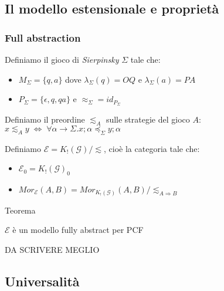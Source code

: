 \documentclass{beamer}
\begin{document}
\subsection{Il modello estensionale e proprietà}

\begin{frame}
	
	\frametitle{Full abstraction}
	
	Definiamo il gioco di \emph{Sierpinsky} $\Sigma$ tale che:
	\begin{itemize}
		\item $M_\Sigma = \{ q,a \}$ dove $\lambda_\Sigma (q)=OQ$ e $\lambda_\Sigma (a)=PA$
		\item $P_\Sigma = \{ \epsilon , q , qa \}$ e $\approx_\Sigma = id_{P_\Sigma}$
	\end{itemize}
	
	Definiamo il preordine $\lesssim_A$ sulle strategie del gioco $A$: $x \lesssim_A y \; \Leftrightarrow \; \forall \alpha \rightarrow \Sigma . x;\alpha \preccurlyeq_\Sigma y;\alpha$
	
	Definiamo $\mathcal{E} = K_!(\mathcal{G}) / \lesssim$, cioè la categoria tale che:
	\begin{itemize}
		\item $\mathcal{E}_0 = K_!(\mathcal{G})_0$
		\item $Mor_{\mathcal{E}}(A,B) = Mor_{K_!(\mathcal{G})}(A,B) / \lesssim_{A\Rightarrow B}$
	\end{itemize}

	
	\begin{block}{Teorema}
		
		$\mathcal{E}$ è un modello fully abstract per PCF
		
	\end{block}
	
	DA SCRIVERE MEGLIO
	
\end{frame}

\subsection{Universalità}
\end{document}
